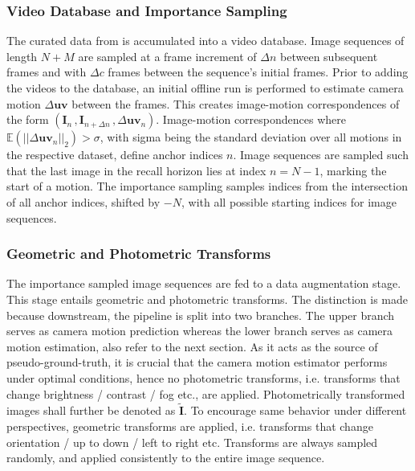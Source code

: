 \subsubsection{Video Database and Importance Sampling}
\label{c3:sec:video_database_and_importance_sampling}
The curated data from  is accumulated into a video database. Image sequences of length $N+M$ are sampled at a frame increment of $\Delta n$ between subsequent frames and with $\Delta c$ frames between the sequence's initial frames. Prior to adding the videos to the database, an initial offline run is performed to estimate camera motion $\Delta\mathbf{uv}$ between the frames. This creates image-motion correspondences of the form $(\mathbf{I}_n\,,\mathbf{I}_{n+\Delta n}\,,\Delta\mathbf{uv}_n)$. Image-motion correspondences where $\mathbb{E}(||\Delta\mathbf{uv}_n||_2) > \sigma$, with sigma being the standard deviation over all motions in the respective dataset, define anchor indices $n$. Image sequences are sampled such that the last image in the recall horizon lies at index $n = N-1$, marking the start of a motion. The importance sampling samples indices from the intersection of all anchor indices, shifted by $-N$, with all possible starting indices for image sequences.

\subsubsection{Geometric and Photometric Transforms}
\label{c3:sec:geometric_and_photometric_transforms}
The importance sampled image sequences are fed to a data augmentation stage. This stage entails geometric and photometric transforms. The distinction is made because downstream, the pipeline is split into two branches. The upper branch serves as camera motion prediction whereas the lower branch serves as camera motion estimation, also refer to the next section.
As it acts as the source of pseudo-ground-truth,
it is crucial that the camera motion estimator performs under optimal conditions, hence no photometric transforms, i.e. transforms that change brightness / contrast / fog etc., are applied. Photometrically transformed images shall further be denoted as $\tilde{\mathbf{I}}$. To encourage same behavior under different perspectives, geometric transforms are applied, i.e. transforms that change orientation / up to down / left to right etc. Transforms are always
sampled randomly, and 
applied consistently to the entire image sequence.
 

